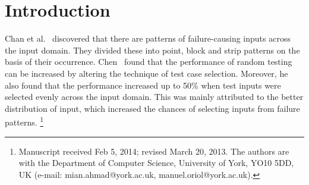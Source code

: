 \documentclass[conference]{IEEEtran}
\newcommand\blfootnote[1]{%
  \begingroup
  \renewcommand\thefootnote{}\footnote{#1}%
  \addtocounter{footnote}{-1}%
  \endgroup
}
\begin{document}
\IEEEpeerreviewmaketitle


\section{Introduction}\label{sec:intro}

Chan et al.~\cite{Chan1996} discovered that there are patterns of failure-causing inputs across the input domain. They divided these into point, block and strip patterns on the basis of their occurrence. Chen~\cite{Chen2008} found that the performance of random testing can be increased by altering the technique of test case selection. Moreover, he also found that the performance increased up to 50\% when test inputs were selected evenly across the input domain. This was mainly attributed to the better distribution of input, which increased the chances of selecting inputs from failure patterns.\blfootnote{Manuscript received Feb 5, 2014; revised March 20, 2013. The authors are with the Department of Computer Science, University of York, YO10 5DD, UK (e-mail: mian.ahmad@york.ac.uk, manuel.oriol@york.ac.uk).}
\end{document}
